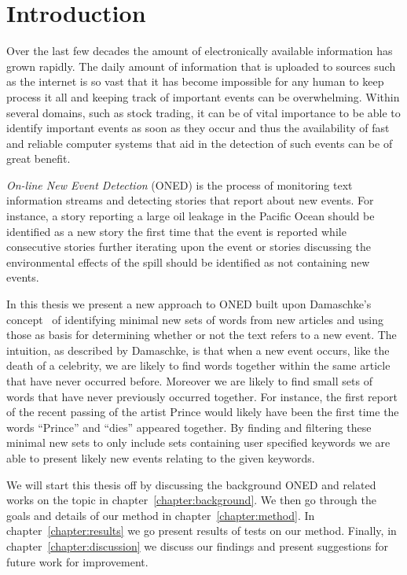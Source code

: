 \chapter{Introduction}
\label{chapter:introduction}
Over the last few decades the amount of electronically available information has grown rapidly. The daily amount of information that is uploaded to sources such as the internet is so vast that it has become impossible for any human to keep process it all and keeping track of important events can be overwhelming. Within several domains, such as stock trading, it can be of vital importance to be able to identify important events as soon as they occur and thus the availability of fast and reliable computer systems that aid in the detection of such events can be of great benefit. 

\emph{On-line New Event Detection} (ONED) is the process of monitoring text information streams and detecting stories that report about new events. For instance, a story reporting a large oil leakage in the Pacific Ocean should be identified as a new story the first time that the event is reported while consecutive stories further iterating upon the event or stories discussing the environmental effects of the spill should be identified as not containing new events. 

In this thesis we present a new approach to ONED built upon Damaschke's concept~\cite{damaschke2015pairs} of identifying minimal new sets of words from new articles and using those as basis for determining whether or not the text refers to a new event. The intuition, as described by Damaschke, is that when a new event occurs, like the death of a celebrity, we are likely to find words together within the same article that have never occurred before. Moreover we are likely to find small sets of words that have never previously occurred together. For instance, the first report of the recent passing of the artist Prince would likely have been the first time the words ``Prince'' and ``dies'' appeared together. By finding and filtering these minimal new sets to only include sets containing user specified keywords we are able to present likely new events relating to the given keywords.

We will start this thesis off by discussing the background ONED and related works on the topic in chapter~\ref{chapter:background}. We then go through the goals and details of our method in chapter~\ref{chapter:method}. In chapter~\ref{chapter:results} we go present results of tests on our method. Finally, in chapter~\ref{chapter:discussion} we discuss our findings and present suggestions for future work for improvement.
